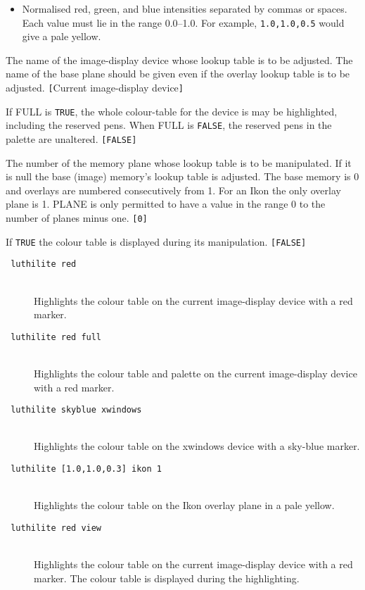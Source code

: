 \documentclass[twoside,11pt]{article}
\newcommand{\htmlref}[2]{#1}
\newcommand{\sstexamples}[1]{
   \goodbreak
   \item[Examples:] \mbox{} \\
   \vspace{-3.5ex}
   \begin{description}
      #1
   \end{description}
}
\newcommand{\sstsubsection}[1]{ \item[{#1}] \mbox{} \\}
\newcommand{\sstexamplesubsection}[2]{\sloppy \item{\ssttt #1} \mbox{} \\ #2 }
\newcommand{\sstnotes}[1]{\pagebreak[3] \item[Notes:] \mbox{} \\[1.3ex] #1}
\newenvironment{sstitemize}{%
  \vspace{-4.3ex}\begin{itemize}}{\end{itemize}}
\newcommand{\sstitemlist}[1]{
  \mbox{} \\
  \vspace{-3.5ex}
  \begin{sstitemize}
     #1
  \end{sstitemize}
}
\newcommand{\ssttt}{\tt}
\renewcommand{\sstexamples}[1]{
      \htmlref{\item[Examples:]}{ap:example}
      \begin{description}
         #1
      \end{description}
   }
\renewcommand{\sstsubsection}[1]{\item[{#1}]}
\renewcommand{\sstexamplesubsection}[2]{\item[{\ssttt #1}] \\ #2}
\renewcommand{\sstnotes}[1]{\item[Notes:]
      \begin{description}
         #1
      \end{description}
   }
\newcommand{\sstitemlist}[1]{
      \begin{itemize}
         #1
      \end{itemize}
   }
\begin{document}
{{{\begin{itemize}
           \item Normalised red, green, and blue intensities separated by
           commas or spaces.  Each value must lie in the range 0.0--1.0.
           For example, {\tt 1.0,1.0,0.5} would give a pale yellow.
         \end{itemize}
      }
      \sstsubsection{
         DEVICE = DEVICE (Read)
      }{
         The name of the image-display device whose lookup table is to
         be adjusted.  The name of the base plane should be given even
         if the overlay lookup table is to be adjusted.
         {\tt [}Current image-display device{\tt ]}
      }
      \sstsubsection{
         FULL = \_LOGICAL (Read)
      }{
         If FULL is {\tt TRUE}, the whole colour-table for the device is
         may be highlighted, including the reserved pens.  When FULL
         is {\tt FALSE}, the reserved pens in the palette are unaltered.
         {\tt [FALSE]}
      }
      \sstsubsection{
         PLANE = \_INTEGER (Read)
      }{
         The number of the memory plane whose lookup table is to be
         manipulated. If it is null the base (image) memory's lookup
         table is adjusted.  The base memory is 0 and overlays are
         numbered consecutively from 1.  For an Ikon the only overlay
         plane is 1.  PLANE is only permitted to have a value in the
         range 0 to the number of planes minus one. {\tt [0]}
      }
      \sstsubsection{
         VIEW = \_LOGICAL (Read)
      }{
         If {\tt TRUE} the colour table is displayed during its manipulation.
         {\tt [FALSE]}
      }
   }
   \sstexamples{
      \sstexamplesubsection{
         luthilite red
      }{
         Highlights the colour table on the current image-display
         device with a red marker.
      }
      \sstexamplesubsection{
         luthilite red full
      }{
         Highlights the colour table and palette on the current
         image-display device with a red marker.
      }
      \sstexamplesubsection{
         luthilite skyblue xwindows
      }{
         Highlights the colour table on the xwindows device with a
         sky-blue marker.
      }
      \sstexamplesubsection{
         luthilite [1.0,1.0,0.3] ikon 1
      }{
         Highlights the colour table on the Ikon overlay plane in a
         pale yellow.
      }
      \sstexamplesubsection{
         luthilite red view
      }{
         Highlights the colour table on the current image-display
         device with a red marker.  The colour table is displayed
         during the highlighting.
      }
   }
   \sstnotes{
      \sstitemlist{

}}}
\end{document}
